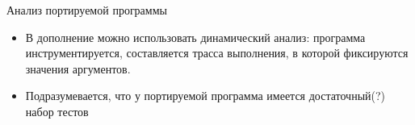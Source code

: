 \documentclass[12pt]{beamer}
\begin{document}
{
\begin{frame}{Анализ портируемой программы}
	\begin{mybox}[]
	\begin{itemize}
	\item В дополнение можно использовать динамический анализ: программа инструментируется, составляется трасса выполнения, в которой фиксируются значения аргументов.
	\item Подразумевается, что у портируемой программа имеется достаточный(?) набор тестов
	\end{itemize}
	\end{mybox}
\end{frame}
}
\end{document}
